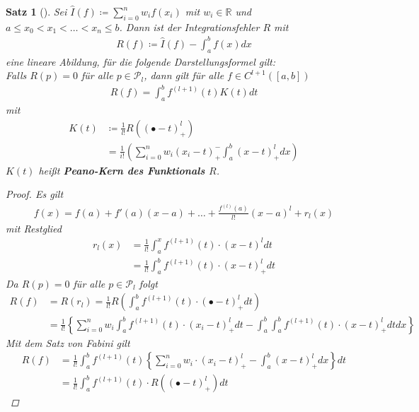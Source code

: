 \documentclass[ngerman,fontsize=11pt, paper=a4, parskip=half, titlepage=true, toc=bib]{scrbook}
\theoremstyle{definition}
\theoremstyle{plain}
\newtheorem{Satz}[Def]{Satz}		%
\newcommand{\R}{\mathds{R}}
\newenvironment{Satze}[1][]{ %
  \begin{Satz}[#1]  }
  { \end{Satz}
  \addtocounter{subsection}{1}}
\begin{document}
\begin{Satze}
  Sei $\hat{I}(f)\coloneqq \sum_{i=0}^n w_if(x_i)$ mit $w_i\in\R$ und
  $a\leq x_0<x_1<\ldots <x_n\leq b$.
Dann ist der Integrationsfehler $R$ mit 
\begin{gather}
  R(f) \coloneqq \hat{I}(f) - \int_a^b f(x) dx
  \label{VII.2.5}
\end{gather}
eine lineare Abildung, für die folgende Darstellungsformel gilt:
\\
Falls $R(p)=0$ für alle $p\in\mathcal{P}_l$, dann gilt 
für alle $f\in C^{l+1}([a,b])$
\begin{gather}
  R(f) = \int_a^bf^{(l+1)}(t) K(t) dt
\label{VII.2.6}
\end{gather}
mit 
\begin{align}\nonumber
  K(t) &\coloneqq \frac{1}{l!}
         R\left( 
         (\bullet -t)_+^l
         \right)\\
  &= \frac{1}{i!}\left( \sum_{i=0}^n w_i(x_i-t)_+^-\int_a^b(x-t)_+^ldx  \right)
\label{VII.2.7}
\end{align}
$K(t)$ heißt \textbf{Peano-Kern des Funktionals
  $R$}.
\begin{proof}
  Es gilt
  \begin{gather*}
    f(x) = f(a) + f'(a)(x-a) +\ldots + \frac{f^{(l)}(a)}{l!}(x-a)^l + r_l(x)
  \end{gather*}
  mit Restglied 
\begin{align*}
  r_l(x) &= \frac{1}{l!} \int_a^xf^{(l+1)} (t)\cdot (x-t)^l dt\\
         &= \frac{1}{l!} \int_a^bf^{(l+1)} (t)\cdot (x-t)_+^l dt
\end{align*}
Da $R(p)=0$ für alle $p\in\mathcal{P}_l$ folgt
\begin{align*}
  R(f) &= R(r_l)
  = \frac{1}{l!} R\left(\int_a^bf^{(l+1)} (t)\cdot(\bullet-t)_+^l
         dt\right)\\
       &=\frac{1}{l!}\left\{ \sum_{i=0}^n w_i \int_a^b f^{(l+1)}(t)
         \cdot (x_i-t)_+^ldt  
         - \int_a^b\int_a^b  f^{(l+1)}(t) \cdot (x-t)_+^ldtdx  \right\}
  \end{align*}
Mit dem Satz von Fabini gilt
\begin{align*}
  R(f) &= \frac{1}{l!}\int_a^bf^{(l+1)}(t) 
         \left\{ 
         \sum_{i=0}^n w_i  \cdot (x_i-t)_+^l  
         - \int_a^b(x-t)_+^ldx  \right\}
         dt\\
  &= \frac{1}{l!} \int_a^bf^{(l+1)}(t) 
    \cdot R\left( (\bullet -t)_+^l\right) dt    
\end{align*}
\end{proof}
\end{Satze}
\end{document}
